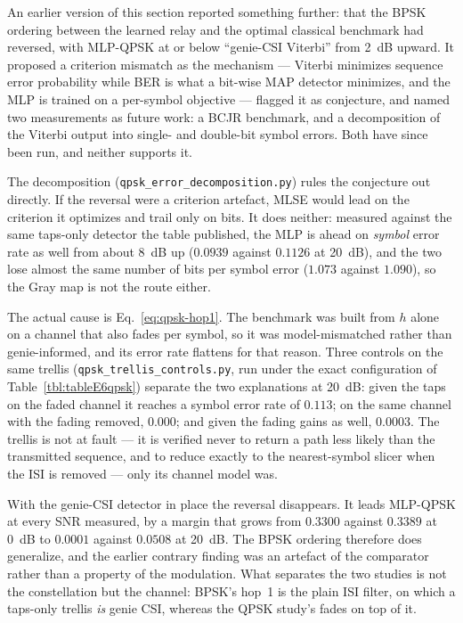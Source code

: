 An earlier version of this section reported something further: that the BPSK ordering between the learned relay and the optimal classical benchmark had reversed, with MLP-QPSK at or below ``genie-CSI Viterbi'' from 2~dB upward. It proposed a criterion mismatch as the mechanism --- Viterbi minimizes sequence error probability while BER is what a bit-wise MAP detector minimizes, and the MLP is trained on a per-symbol objective --- flagged it as conjecture, and named two measurements as future work: a BCJR benchmark, and a decomposition of the Viterbi output into single- and double-bit symbol errors. Both have since been run, and neither supports it.

The decomposition (\texttt{qpsk\_error\_decomposition.py}) rules the conjecture out directly. If the reversal were a criterion artefact, MLSE would lead on the criterion it optimizes and trail only on bits. It does neither: measured against the same taps-only detector the table published, the MLP is ahead on \emph{symbol} error rate as well from about 8~dB up ($0.0939$ against $0.1126$ at 20~dB), and the two lose almost the same number of bits per symbol error ($1.073$ against $1.090$), so the Gray map is not the route either.

The actual cause is Eq.~\eqref{eq:qpsk-hop1}. The benchmark was built from $h$ alone on a channel that also fades per symbol, so it was model-mismatched rather than genie-informed, and its error rate flattens for that reason. Three controls on the same trellis (\texttt{qpsk\_trellis\_controls.py}, run under the exact configuration of Table~\ref{tbl:tableE6qpsk}) separate the two explanations at 20~dB: given the taps on the faded channel it reaches a symbol error rate of $0.113$; on the same channel with the fading removed, $0.000$; and given the fading gains as well, $0.0003$. The trellis is not at fault --- it is verified never to return a path less likely than the transmitted sequence, and to reduce exactly to the nearest-symbol slicer when the ISI is removed --- only its channel model was.

With the genie-CSI detector in place the reversal disappears. It leads MLP-QPSK at every SNR measured, by a margin that grows from $0.3300$ against $0.3389$ at 0~dB to $0.0001$ against $0.0508$ at 20~dB. The BPSK ordering therefore does generalize, and the earlier contrary finding was an artefact of the comparator rather than a property of the modulation. What separates the two studies is not the constellation but the channel: BPSK's hop~1 is the plain ISI filter, on which a taps-only trellis \emph{is} genie CSI, whereas the QPSK study's fades on top of it.

